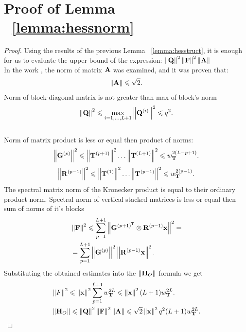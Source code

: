 \documentclass[conference]{IEEEtran}
\begin{document}
\section{Proof of Lemma ~\ref{lemma:hessnorm}}\label{app:lemma:hessnorm}
\begin{proof}
Using the results of the previous Lemma ~\ref{lemma:hesstruct}, it is enough for us to evaluate the upper bound of the expression: $\left\|\mathbf{Q}\right\|^2\left\|\mathbf{F}\right\|^2\left\|\mathbf{A}\right\|$ \\
In the work \cite{kiselev2024unravelinghessiankeysmooth}, the norm of matrix $\mathbf{A}$ was examined, and it was proven that: 
\[\left\|\mathbf{A}\right\| \leqslant \sqrt{2}.\] 
Norm of block-diagonal matrix is not greater than max of block's norm \\
\[\left\|\mathbf{Q}\right\|^2 \leqslant \max\limits_{i=1,\dots,L+1}\left\|\mathbf{Q}^{(i)}\right\|^2 \leqslant q^2.\] \\
Norm of matrix product is less or equal then product of norms:
\[\left\|\mathbf{G}^{(p)}\right\|^2 \leqslant \left\|\mathbf{T}^{(p+1)}\right\|^2 \dots\left\|\mathbf{T}^{(L+1)}\right\|^2 \leqslant w_{\mathbf{T}}^{2(L - p + 1)}.\]
\[\left\|\mathbf{R}^{(p-1)}\right\|^2 \leqslant \left\|\mathbf{T}^{(1)}\right\|^2 \dots \left\|\mathbf{T}^{(p-1)}\right\|^2 \leqslant w_{\mathbf{T}}^{2(p-1)}. \]
The spectral matrix norm of the Kronecker product is equal to their ordinary product norm. Spectral norm of vertical stacked matrices is less or equal then sum of norms of it's blocks
\begin{align*}
& \norm{\bF}^2 \leqslant \sum\limits_{p=1}^{L+1}\norm{\bG^{(p+1)\T}\otimes \bR^{(p-1)}\bx}^2 = \\ 
& = \sum\limits_{p=1}^{L+1}\norm{\bG^{(p)}}^2\norm{\bR^{(p-1)}\bx}^2.
\end{align*}
Substituting the obtained estimates into the $\left\|\mathbf{H}_O\right\|$ formula we get
\begin{align*}
& \left\|F\right\|^2 \leqslant \left\|\mathbf{x}\right\|^2\sum\limits_{p=1}^{L+1}w_{\mathbf{T}}^{2L} \leqslant \left\|\mathbf{x}\right\|^2(L+1)w_{\mathbf{T}}^{2L}. \\
& \left\|\mathbf{H}_O\right\| \leqslant \left\|\mathbf{Q}\right\|^2 \left\|\mathbf{F}\right\|^2\left\|\mathbf{A}\right\| \leqslant \sqrt{2}\left\|\mathbf{x}\right\|^2q^2(L+1)w_{\mathbf{T}}^{2L}.
\end{align*}

\end{proof}
\end{document}
